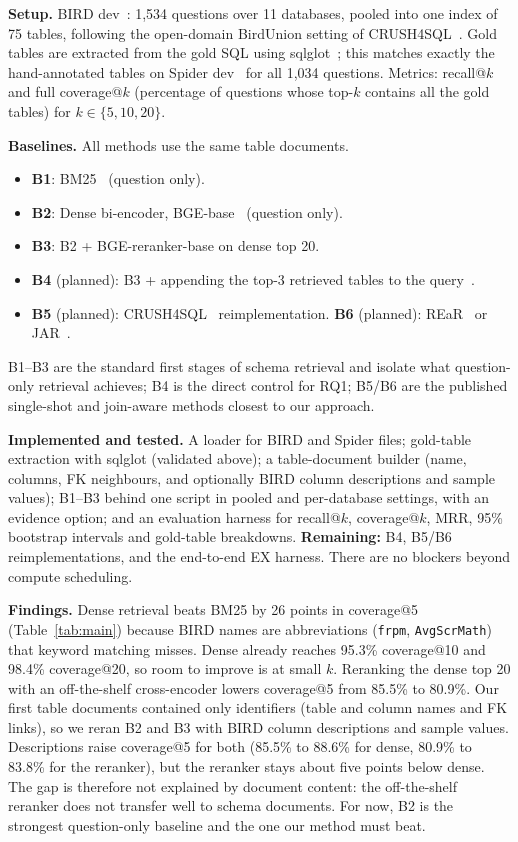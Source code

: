 \documentclass[sigconf,nonacm]{acmart}
\begin{document}
\textbf{Setup.} BIRD dev~\cite{bird}: 1,534 questions over 11 databases, pooled into one index of 75 tables, following the open-domain BirdUnion setting of CRUSH4SQL~\cite{crush}. Gold tables are extracted from the gold SQL using sqlglot~\cite{sqlglot}; this matches exactly the hand-annotated tables on Spider dev~\cite{spider} for all 1,034 questions. Metrics: recall@$k$ and full coverage@$k$ (percentage of questions whose top-$k$ contains all the gold tables) for $k\in\{5,10,20\}$.

\textbf{Baselines.} All methods use the same table documents.
\begin{itemize}
\item \textbf{B1}: BM25~\cite{bm25s} (question only).
\item \textbf{B2}: Dense bi-encoder, BGE-base~\cite{bge} (question only).
\item \textbf{B3}: B2 + BGE-reranker-base on dense top 20.
\item \textbf{B4} (planned): B3 + appending the top-3 retrieved tables to the query~\cite{murre}.
\item \textbf{B5} (planned): CRUSH4SQL~\cite{crush} reimplementation. \textbf{B6} (planned): REaR~\cite{rear} or JAR~\cite{jar}.
\end{itemize}
B1--B3 are the standard first stages of schema retrieval and isolate what question-only retrieval achieves; B4 is the direct control for RQ1; B5/B6 are the published single-shot and join-aware methods closest to our approach.

\textbf{Implemented and tested.} A loader for BIRD and Spider files; gold-table extraction with sqlglot (validated above); a table-document builder (name, columns, FK neighbours, and optionally BIRD column descriptions and sample values); B1--B3 behind one script in pooled and per-database settings, with an evidence option; and an evaluation harness for recall@$k$, coverage@$k$, MRR, 95\% bootstrap intervals and gold-table breakdowns. \textbf{Remaining:} B4, B5/B6 reimplementations, and the end-to-end EX harness. There are no blockers beyond compute scheduling.


\textbf{Findings.} Dense retrieval beats BM25 by 26 points in coverage@5 (Table~\ref{tab:main}) because BIRD names are abbreviations (\texttt{frpm}, \texttt{AvgScrMath}) that keyword matching misses. Dense already reaches 95.3\% coverage@10 and 98.4\% coverage@20, so room to improve is at small $k$. Reranking the dense top 20 with an off-the-shelf cross-encoder lowers coverage@5 from 85.5\% to 80.9\%. Our first table documents contained only identifiers (table and column names and FK links), so we reran B2 and B3 with BIRD column descriptions and sample values. Descriptions raise coverage@5 for both (85.5\% to 88.6\% for dense, 80.9\% to 83.8\% for the reranker), but the reranker stays about five points below dense. The gap is therefore not explained by document content: the off-the-shelf reranker does not transfer well to schema documents. For now, B2 is the strongest question-only baseline and the one our method must beat.
\end{document}
